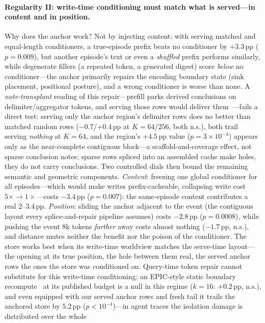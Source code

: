 \documentclass{article} %
\newcommand{\pp}{\,\mathrm{pp}}
\begin{document}
\paragraph{Regularity II: write-time conditioning must match what is served---in content
and in position.} Why does the anchor work? Not by injecting content: with serving matched and
equal-length conditioners, a true-episode prefix beats no conditioner by $+3.3\pp$
($p{=}0.009$), but another episode's text or even a \emph{shuffled} prefix performs
similarly, while degenerate fillers (a repeated token, a generated digest) score \emph{below}
no conditioner---the anchor primarily repairs the encoding boundary state (sink placement,
positional posture), and a wrong conditioner is worse than none. A \emph{note-transplant}
reading of this repair---prefill parks derived conclusions on delimiter/aggregator tokens,
and serving those rows would deliver them~\citep{kvnotes}---fails a direct test: serving
only the anchor region's delimiter rows does no better than matched random rows
($-0.7$/$+0.4\pp$ at $K{=}64$/$256$, both n.s.), both trail serving \emph{nothing} at
$K{=}64$, and the region's $+4.5\pp$ value ($p{=}3{\times}10^{-4}$) appears only as the
near-complete contiguous block---a scaffold-and-coverage effect, not sparse conclusion
notes; sparse rows spliced into an assembled cache make holes, they do not carry
conclusions. Two controlled dials then
bound the remaining semantic and geometric components. \emph{Content}: freezing one global
conditioner for all episodes---which would make writes prefix-cacheable, collapsing write
cost $5\times{\to}1\times$---costs $-3.4\pp$ ($p{=}0.007$): the same-episode content
contributes a real $2$--$3.4\pp$. \emph{Position}: sliding the anchor adjacent to the event
(the contiguous layout every splice-and-repair pipeline assumes) costs $-2.8\pp$
($p{=}0.0008$), while pushing the event $8$k tokens \emph{farther} away costs almost
nothing ($-1.7\pp$, n.s.), and distance mutes neither the benefit nor the poison of the
conditioner. The store works best when its write-time worldview matches the serve-time
layout---the opening at its true position, the hole between them real, the served anchor
rows the ones the store was conditioned on. Query-time token repair cannot substitute for
this write-time conditioning: an EPIC-style static boundary recompute~\citep{epic} at its
published budget is a null in this regime ($k{=}16$: $+0.2\pp$, n.s.), and even equipped
with our served anchor rows and fresh tail it trails the anchored store by $5.2\pp$
($p{<}10^{-4}$)---in agent traces the isolation damage is distributed over the whole
\end{document}
